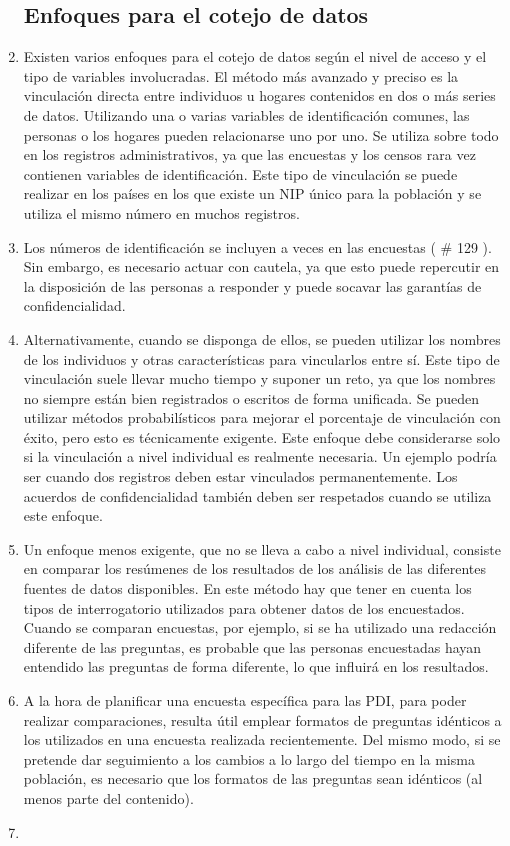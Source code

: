 \documentclass[
]{book}
\begin{document}
\begin{enumerate}
{  \subsection{Enfoques para el cotejo de datos}\label{enfoques-para-el-cotejo-de-datos}}
\item
  Existen varios enfoques para el cotejo de datos según el nivel de acceso y el tipo de variables involucradas. El método más avanzado y preciso es la vinculación directa entre individuos u hogares contenidos en dos o más series de datos. Utilizando una o varias variables de identificación comunes, las personas o los hogares pueden relacionarse uno por uno. Se utiliza sobre todo en los registros administrativos, ya que las encuestas y los censos rara vez contienen variables de identificación. Este tipo de vinculación se puede realizar en los países en los que existe un NIP único para la población y se utiliza el mismo número en muchos registros.
\item
  Los números de identificación se incluyen a veces en las encuestas (
  \# 129
  ). Sin embargo, es necesario actuar con cautela, ya que esto puede repercutir en la disposición de las personas a responder y puede socavar las garantías de confidencialidad.
\item
  Alternativamente, cuando se disponga de ellos, se pueden utilizar los nombres de los individuos y otras características para vincularlos entre sí. Este tipo de vinculación suele llevar mucho tiempo y suponer un reto, ya que los nombres no siempre están bien registrados o escritos de forma unificada. Se pueden utilizar métodos probabilísticos para mejorar el porcentaje de vinculación con éxito, pero esto es técnicamente exigente. Este enfoque debe considerarse solo si la vinculación a nivel individual es realmente necesaria. Un ejemplo podría ser cuando dos registros deben estar vinculados permanentemente. Los acuerdos de confidencialidad también deben ser respetados cuando se utiliza este enfoque.
\item
  Un enfoque menos exigente, que no se lleva a cabo a nivel individual, consiste en comparar los resúmenes de los resultados de los análisis de las diferentes fuentes de datos disponibles. En este método hay que tener en cuenta los tipos de interrogatorio utilizados para obtener datos de los encuestados. Cuando se comparan encuestas, por ejemplo, si se ha utilizado una redacción diferente de las preguntas, es probable que las personas encuestadas hayan entendido las preguntas de forma diferente, lo que influirá en los resultados.
\item
  A la hora de planificar una encuesta específica para las PDI, para poder realizar comparaciones, resulta útil emplear formatos de preguntas idénticos a los utilizados en una encuesta realizada recientemente. Del mismo modo, si se pretende dar seguimiento a los cambios a lo largo del tiempo en la misma población, es necesario que los formatos de las preguntas sean idénticos (al menos parte del contenido).
\item ~
  \hypertarget{seleccionar-entre-diferentes-fuentes-de-datos}{%
}
\end{enumerate}
\end{document}
